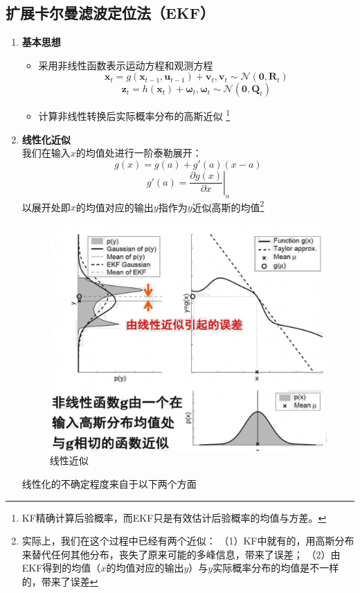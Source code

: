 \documentclass[../main.tex]{subfiles}
\begin{document}
\subsection{扩展卡尔曼滤波定位法（EKF）}
\begin{enumerate}
    \item \textbf{基本思想}
        \begin{itemize}
            \item 采用非线性函数表示运动方程和观测方程
            $$\mathbf{x}_t=g(\mathbf{x}_{t-1},\mathbf{u}_{t-1})+\mathbf{v}_t,\mathbf{v}_t\sim\mathcal{N}\left(\mathbf{0},\mathbf{R}_t\right)$$
            $$\mathbf{z}_t=h(\mathbf{x}_t)+\mathbf{\omega}_t,\mathbf{\omega}_t\sim \mathcal{N}(\mathbf{0},\mathbf{Q}_t)$$
            \item 计算非线性转换后实际概率分布的高斯近似
            \footnote{KF精确计算后验概率，而EKF只是有效估计后验概率的均值与方差。}
        \end{itemize}
    \item \textbf{线性化近似}\\
        我们在输入$x$的均值处进行一阶泰勒展开： 
        $$g(x)=g(a)+g'(a)(x-a)$$
        $$g'(a)=\left.\frac{\partial g(x)}{\partial x}\right|_{a}$$
        以展开处即$x$的均值对应的输出$y$指作为$y$近似高斯的均值\footnote{实际上，我们在这个过程中已经有两个近似：
        （1）KF中就有的，用高斯分布来替代任何其他分布，丧失了原来可能的多峰信息，带来了误差；
        （2）由EKF得到的均值（$x$的均值对应的输出$y$）与$y$实际概率分布的均值是不一样的，带来了误差}
        \begin{figure}[H]
            \centering
            \includegraphics[width=0.6\linewidth]{images/ekf.png}
            \caption{线性近似}
        \end{figure}
        线性化的不确定程度来自于以下两个方面


\end{enumerate}
\end{document}
